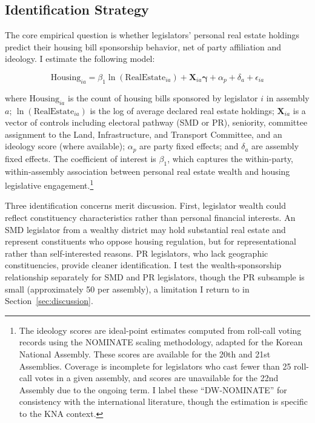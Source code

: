 \documentclass[11pt]{article}
\begin{document}
\subsection{Identification Strategy}

The core empirical question is whether legislators' personal real estate holdings predict their housing bill sponsorship behavior, net of party affiliation and ideology. I estimate the following model:

\begin{equation}
\text{Housing}_{ia} = \beta_1 \ln(\text{RealEstate}_{ia}) + \mathbf{X}_{ia} \boldsymbol{\gamma} + \alpha_p + \delta_a + \epsilon_{ia}
\label{eq:main}
\end{equation}

\noindent where $\text{Housing}_{ia}$ is the count of housing bills sponsored by legislator $i$ in assembly $a$; $\ln(\text{RealEstate}_{ia})$ is the log of average declared real estate holdings; $\mathbf{X}_{ia}$ is a vector of controls including electoral pathway (SMD or PR), seniority, committee assignment to the Land, Infrastructure, and Transport Committee, and an ideology score (where available); $\alpha_p$ are party fixed effects; and $\delta_a$ are assembly fixed effects. The coefficient of interest is $\beta_1$, which captures the within-party, within-assembly association between personal real estate wealth and housing legislative engagement.\footnote{The ideology scores are ideal-point estimates computed from roll-call voting records using the NOMINATE scaling methodology, adapted for the Korean National Assembly. These scores are available for the 20th and 21st Assemblies. Coverage is incomplete for legislators who cast fewer than 25 roll-call votes in a given assembly, and scores are unavailable for the 22nd Assembly due to the ongoing term. I label these ``DW-NOMINATE'' for consistency with the international literature, though the estimation is specific to the KNA context.}

Three identification concerns merit discussion. First, legislator wealth could reflect constituency characteristics rather than personal financial interests. An SMD legislator from a wealthy district may hold substantial real estate and represent constituents who oppose housing regulation, but for representational rather than self-interested reasons. PR legislators, who lack geographic constituencies, provide cleaner identification. I test the wealth-sponsorship relationship separately for SMD and PR legislators, though the PR subsample is small (approximately 50 per assembly), a limitation I return to in Section~\ref{sec:discussion}.
\end{document}
